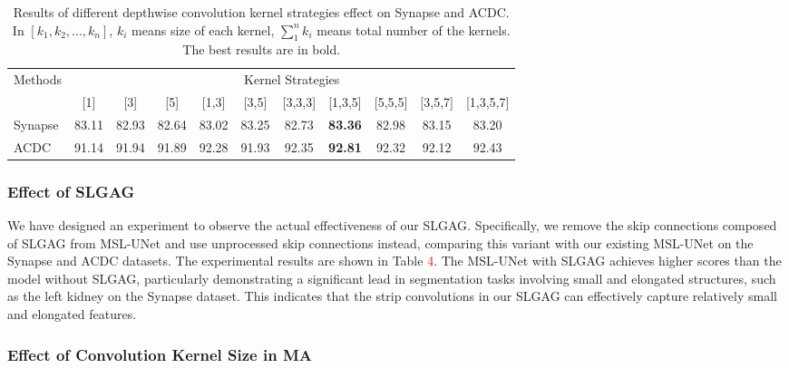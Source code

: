 \documentclass[10pt, a4paper, twocolumn]{article}
\begin{document}
\begin{table}
\normalsize
\centering
\begin{tabular}{l|cccccccccc}\hline
\multirow{2}{*}{Methods} & \multicolumn{10}{c}{Kernel Strategies} \\\cline{2-11}

& [1] & [3] & [5] & [1,3] & [3,5] & [3,3,3] &[1,3,5]& [5,5,5] &[3,5,7] &[1,3,5,7]  \\\hline


Synapse& 83.11& 82.93& 82.64& 83.02& 83.25& 82.73 & \textbf{83.36}& 82.98& 83.15& 83.20 \\
ACDC & 91.14 &91.94 & 91.89 &92.28& 91.93& 92.35& \textbf{92.81}& 92.32& 92.12& 92.43\\
\hline
\end{tabular}
\caption{Results of different depthwise convolution kernel strategies effect on Synapse and ACDC. In $[k_{1},k_{2},...,k_{n}]$, $k_{i}$ means size of each kernel, $\sum_{1}^{n}k_{i}$ means total number of the kernels. The best results are in bold.}
\end{table}




\subsubsection{Effect of SLGAG}

We have designed an experiment to observe the actual effectiveness of our SLGAG. Specifically, we remove the skip connections composed of SLGAG from MSL-UNet and use unprocessed skip connections instead, comparing this variant with our existing MSL-UNet on the Synapse and ACDC datasets. The experimental results are shown in Table \textcolor{red}{4}. The MSL-UNet with SLGAG achieves higher scores than the model without SLGAG, particularly demonstrating a significant lead in segmentation tasks involving small and elongated structures, such as the left kidney on the Synapse dataset. This indicates that the strip convolutions in our SLGAG can effectively capture relatively small and elongated features.


\subsubsection{Effect of Convolution Kernel Size in MA}
\end{document}
